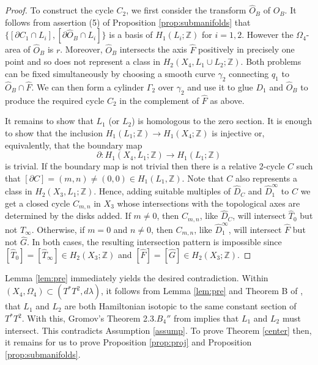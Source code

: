 \documentclass[12pt]{amsart}
\theoremstyle{definition}
\newcommand{\ZZ}{{\mathbb Z}}
\begin{document}
\begin{proof}
To construct the cycle $C_2$, we first consider the transform $\hat{O}_B$ of $O_B$. It follows from assertion (5) of Proposition \ref{prop:submanifolds} that 
$\{[\partial C_1 \cap L_i], [\partial \hat{O}_B \cap L_i]\}$ is a basis of  $H_1(L_i;\ZZ)$ for $i=1,2$.
However the $\Omega_4$-area of $\hat{O}_B$ is $r$. Moreover, $\hat{O}_B$ intersects the axis $\hat{F}$ positively in precisely one point and so does not represent a class in $H_2(X_4, L_1 \cup L_2;\ZZ)$. Both problems can be fixed simultaneously by choosing a smooth curve $\gamma_2$ connecting $q_1$ to $\hat{O}_B \cap \hat{F}$. We can then form a cylinder $\Gamma_2$ over $\gamma_2$ and use it to glue $D_1$ and $\hat{O}_B$ to produce the required cycle $C_2$ in the complement of $\hat{F}$ as above.


It remains to show that $L_1$ (or $L_2$) is homologous to the zero section. It is enough to show that the inclusion $H_1(L_1;\ZZ) \to H_1(X_4;\ZZ)$ is injective or, equivalently, that the boundary map $$\partial \colon H_1(X_4,L_1;\ZZ) \to H_1(L_1;\ZZ)$$ is trivial. If the boundary map is not trivial then there is a relative 2-cycle $C$ such that $[\partial C] = (m,n) \neq (0,0) \in H_1(L_1, \ZZ).$ Note that $C$ also represents a class in $H_2(X_3, L_1;\ZZ)$. Hence, adding suitable multiples of $\hat{D}_C$ and $\hat{D}_1^{\infty}$ to $C$ we get a closed cycle $C_{m,n}$ in $X_3$ whose intersections with the topological axes are determined by the disks added. If $m\neq 0$, then $C_{m,n}$, like $\hat{D}_C$,  will intersect $\hat{T}_0$ but not $\hat{T}_{\infty}$. Otherwise, if $m=0$ and $n\neq0$, then $C_{m,n}$, like $\hat{D}_1^{\infty}$,  will intersect $\hat{F}$ but not $\hat{G}$. In both cases, the resulting intersection pattern is impossible since $[\hat{T}_0]=[\hat{T}_{\infty}] \in H_2(X_3;\ZZ)$ and $[\hat{F}] =[\hat{G}]\in H_2(X_3;\ZZ)$.
\end{proof}

Lemma \ref{lem:pre} immediately yields the desired contradiction. Within $(X_4, \Omega_4) \subset (T^*T^2, d \lambda)$, it follows from Lemma \ref{lem:pre} and Theorem B of \cite{rgi}, that $L_1$ and $L_2$ are both Hamiltonian isotopic to the same constant section of $T^*T^2$. With this, Gromov's Theorem 2.3.$B_4''$ from \cite{gr} implies that $L_1$ and $L_2$ must intersect.  This contradicts Assumption \ref{assump}. To prove Theorem \ref{center} then, it remains for us to prove Proposition \ref{prop:proj} and Proposition \ref{prop:submanifolds}.
\end{document}
